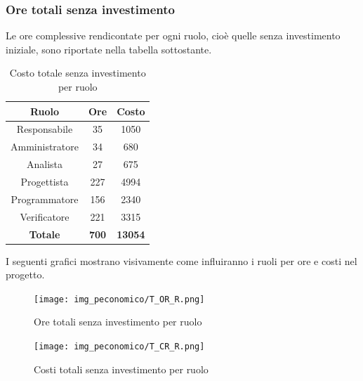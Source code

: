 \subsubsection{Ore totali senza investimento}
Le ore complessive rendicontate per ogni ruolo, cioè quelle senza investimento iniziale, sono riportate nella tabella sottostante.
\begin{table}[H]
	\centering
	\begin{tabular}{|c|c|c|}
		\hline
		\textbf{Ruolo} &
		\textbf{Ore} &
		\textbf{Costo} \\
		\hline
		Responsabile & 35 & 1050\\
		\hline
		Amministratore & 34 & 680\\
		\hline
		Analista & 27 & 675\\
		\hline
		Progettista & 227 & 4994 \\
		\hline
		Programmatore & 156 & 2340 \\
		\hline
		Verificatore & 221 & 3315\\
		\hline
		\textbf{Totale} & \textbf{700} & \textbf{13054} \\
		\hline
	\end{tabular}
	\caption{Costo totale senza investimento per ruolo}
\end{table}
I seguenti grafici mostrano visivamente come influiranno i ruoli per ore e costi nel progetto.
\begin{figure}[H]
	\centering
	\texttt{[image: img\_peconomico/T\_OR\_R.png]}
	\caption{Ore totali senza investimento per ruolo}
\end{figure}
\begin{figure}[H]
	\centering
	\texttt{[image: img\_peconomico/T\_CR\_R.png]}
	\caption{Costi totali senza investimento per ruolo}
\end{figure}





